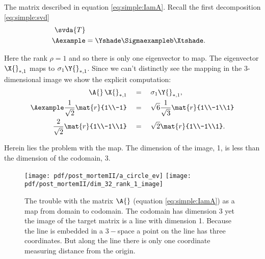 The matrix described in equation \eqref{eq:simple:IamA}.
Recall the first decomposition \eqref{eq:simple:svd}
\begin{equation*}
  \begin{split}
    \svda{T} \\
    \Aexample &= \Yshade \Sigmaexampleb \Xtshade.
  \end{split}
\end{equation*}

Here the rank $\rho=1$ and so there is only one eigenvector to map. The eigenvector $\X{}_{*,1}$ maps to $\sigma_{1}\Y{}_{*,1}$. Since we can't distinctly see the mapping in the 3-dimensional image we show the explicit computation:
\begin{equation}
  \begin{split}
    \A{}\,\X{}_{*,1}\quad &= \quad \sigma_{1}\Y{}_{*,1}, \\
    \Aexample \frac{1}{\sqrt{2}}\mat{r}{1\\-1} \quad & =  \quad \sqrt{6}\frac{1}{\sqrt{3}}\mat{r}{1\\-1\\1}\\
    \frac{2}{\sqrt{2}}\mat{r}{1\\-1\\1}  \quad & =  \quad \sqrt{2}\mat{r}{1\\-1\\1}.
  \end{split}
\end{equation}

Herein lies the problem with the map. The dimension of the image, 1, is less than the dimension of the codomain, 3.

\begin{figure}[htbp] %
   \centering
   \texttt{[image: pdf/post\_mortemII/a\_circle\_ev]} \qquad
   \texttt{[image: pdf/post\_mortemII/dim\_32\_rank\_1\_image]} 
   \caption[The trouble with the matrix $\A{}$]{The trouble with the matrix $\A{}$ (equation \eqref{eq:simple:IamA}) as a map from domain to codomain. The codomain has dimension 3 yet the image of the target matrix is a line with dimension 1. Because the line is embedded in a $3-$space a point on the line has three coordinates. But along the line there is only one coordinate measuring distance from the origin.}
   \label{fig:toright}
\end{figure}

